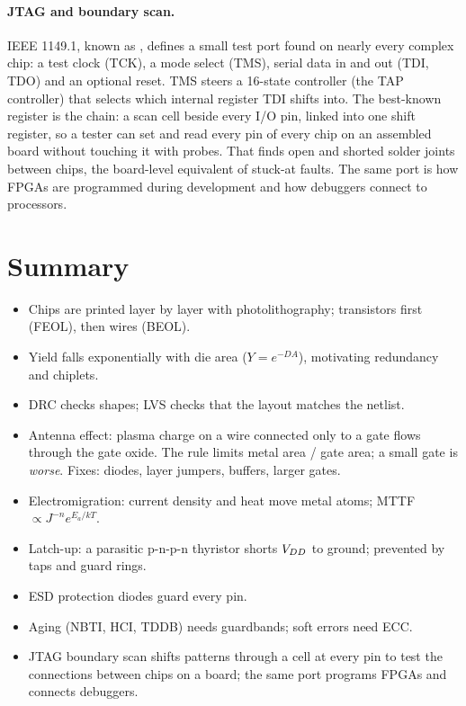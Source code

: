 \paragraph{JTAG and boundary scan.} IEEE 1149.1, known as , defines a small test port found on nearly every complex chip: a test clock (TCK), a mode select (TMS), serial data in and out (TDI, TDO) and an optional reset. TMS steers a 16-state controller (the TAP controller) that selects which internal register TDI shifts into. The best-known register is the  chain: a scan cell beside every I/O pin, linked into one shift register, so a tester can set and read every pin of every chip on an assembled board without touching it with probes. That finds open and shorted solder joints between chips, the board-level equivalent of stuck-at faults. The same port is how FPGAs are programmed during development and how debuggers connect to processors.

\section{Summary}

\begin{itemize}
  \item Chips are printed layer by layer with photolithography; transistors first (FEOL), then wires (BEOL).
  \item Yield falls exponentially with die area ($Y = e^{-DA}$), motivating redundancy and chiplets.
  \item DRC checks shapes; LVS checks that the layout matches the netlist.
  \item Antenna effect: plasma charge on a wire connected only to a gate flows through the gate oxide. The rule limits metal area / gate area; a small gate is \emph{worse}. Fixes: diodes, layer jumpers, buffers, larger gates.
  \item Electromigration: current density and heat move metal atoms; MTTF $\propto J^{-n}e^{E_a/kT}$.
  \item Latch-up: a parasitic p-n-p-n thyristor shorts $V_{DD}$ to ground; prevented by taps and guard rings.
  \item ESD protection diodes guard every pin.
  \item Aging (NBTI, HCI, TDDB) needs guardbands; soft errors need ECC.
  \item JTAG boundary scan shifts patterns through a cell at every pin to test the connections between chips on a board; the same port programs FPGAs and connects debuggers.
\end{itemize}

